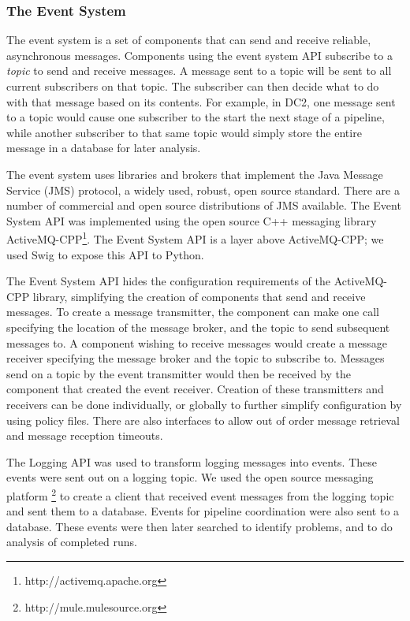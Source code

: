 \subsubsection{The Event System}\label{sMw-ev}

The event system is a set of components that can send and receive reliable, 
asynchronous messages.  Components using the event system API subscribe to a 
\textit{topic} to send and receive messages.   A message sent to a topic will be sent
to all current subscribers on that topic.    The subscriber can then decide 
what to do with that message based on its contents.   For example, in DC2, one
message sent to a topic would cause one subscriber to the start the next stage
of a pipeline,  while another subscriber to that same topic would simply 
store the entire message in a database for later analysis. 

The event system uses libraries and brokers that implement the Java Message 
Service (JMS) protocol, a widely used, robust, open source standard. There are
a number of commercial and open source distributions of JMS available.  The 
Event System API was implemented using the open source C++ messaging library 
ActiveMQ-CPP\footnote{http://activemq.apache.org}.
The Event System API is a layer above ActiveMQ-CPP; we used 
Swig to expose this API to Python. 

The Event System API hides the configuration requirements of the ActiveMQ-CPP
library, simplifying the creation of components that send and receive
messages.  To create a message transmitter, the component can make one call 
specifying the location of the message broker, and the topic to send
subsequent messages to.   A component wishing to receive messages would 
create a message receiver specifying the message broker and the topic to 
subscribe to.    Messages send on a topic by the event transmitter would then
be received by the component that created the event receiver.   Creation of
these transmitters and receivers can be done individually, or globally to 
further simplify configuration by using policy files.  There are also
interfaces to allow out of order message retrieval and message reception
timeouts.

The Logging API was used to transform logging messages into events.  These
events were sent out on a logging topic.   We used the open source messaging
platform \footnote{http://mule.mulesource.org}
to create a client that received event messages from the logging
topic and sent them to a database.  Events for pipeline coordination were also
sent to a database.  These events were then later searched to identify 
problems, and to do analysis of completed runs.
